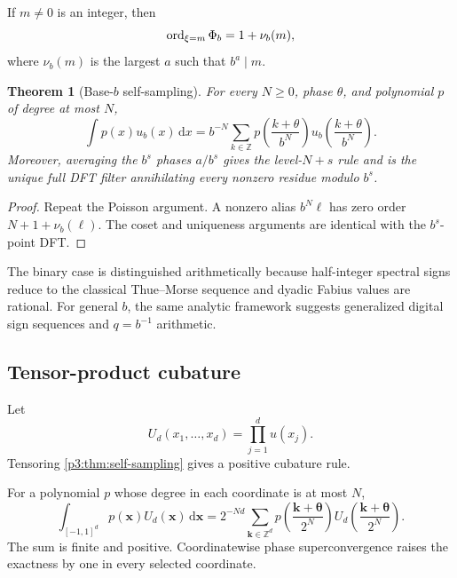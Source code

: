 \documentclass[11pt,oneside]{article}
\numberwithin{equation}{section}
\newtheorem{theorem}{Theorem}[section]
\theoremstyle{definition}
\theoremstyle{remark}
\newcommand{\Z}{\mathbb Z}
\newcommand{\dd}{\,\mathrm d}
\begin{document}
If $m\ne0$ is an integer, then
\begin{equation}
 \operatorname{ord}_{\xi=m}\Phi_b=1+\nu_b(m),
 \label{p3:eq:b-multiplicity}
\end{equation}
where $\nu_b(m)$ is the largest $a$ such that $b^a\mid m$.

\begin{theorem}[Base-$b$ self-sampling]
\label{p3:thm:base-b}
For every $N\ge0$, phase $\theta$, and polynomial $p$ of degree at most $N$,
\begin{equation}
 \int p(x)u_b(x)\dd x
 =b^{-N}\sum_{k\in\Z}
 p\!\left(\frac{k+\theta}{b^N}\right)
 u_b\!\left(\frac{k+\theta}{b^N}\right).
 \label{p3:eq:base-b-self-sampling}
\end{equation}
Moreover, averaging the $b^s$ phases $a/b^s$ gives the level-$N+s$ rule and is the unique full DFT filter annihilating every nonzero residue modulo $b^s$.
\end{theorem}

\begin{proof}
Repeat the Poisson argument.  A nonzero alias $b^N\ell$ has zero order $N+1+\nu_b(\ell)$.  The coset and uniqueness arguments are identical with the $b^s$-point DFT.
\end{proof}

The binary case is distinguished arithmetically because half-integer spectral signs reduce to the classical Thue--Morse sequence and dyadic Fabius values are rational.  For general $b$, the same analytic framework suggests generalized digital sign sequences and $q=b^{-1}$ arithmetic.

\subsection{Tensor-product cubature}

Let
\begin{equation}
 U_d(x_1,\ldots,x_d)=\prod_{j=1}^{d}u(x_j).
 \label{p3:eq:tensor-density}
\end{equation}
Tensoring \cref{p3:thm:self-sampling} gives a positive cubature rule.

\begin{corollary}
\label{p3:cor:tensor-cubature}
For a polynomial $p$ whose degree in each coordinate is at most $N$,
\begin{equation}
 \int_{[-1,1]^d}p(\bm x)U_d(\bm x)\dd\bm x
 =2^{-Nd}\sum_{\bm k\in\Z^d}
 p\!\left(\frac{\bm k+\bm\theta}{2^N}\right)
 U_d\!\left(\frac{\bm k+\bm\theta}{2^N}\right).
 \label{p3:eq:tensor-cubature}
\end{equation}
The sum is finite and positive.  Coordinatewise phase superconvergence raises the exactness by one in every selected coordinate.
\end{corollary}
\end{document}
